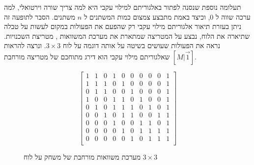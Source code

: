 \documentclass[12pt,leqno]{article}
\theoremstyle{theoremdd}
\begin{document}
תעלומה נוספת שנסנה לפתור באלגוריתם למילוי עקבי היא למה צריך שורה וירטואלי, למה ערכה 
שווה ל
$0$,
וכיצד באמת מתבצע צמצום כמות המשתנים ל
$n$
משתנים.
הסבר לתופעה זה
ניתן בעזרת תיאור אלגוריתם מילוי עקבי רק שהפעם את
הפעולות במקום לעשות על טבלה שתיארה את הלוח, נבצע על המטריצה שמתארת את מערכת המשוואות 
,
מטריצת השכנויות.
נראה את הפעולות שעושים בשיטה על אותה דוגמה 
על לוח 
$3 \times 3$.
 ונרצה להראות שאלגוריתם מילוי עקבי הוא דירג מתוחכם של מטריצה מורחבת 
$[M | \vec{1}]$.

\begin{figure}[ht]
    \caption{
        מערכת משוואות מורחבת של משחק על לוח 
        $3 \times 3$
    }
    \label{fig: full matrix 3 x 3}
    \begin{english}
        \begin{center}
            \[\left[
            \begin{array}{ccccccccc|c}
                    1& 1& 0& 1& 0& 0& 0& 0& 0& 1 \\
                    1& 1& 1& 0& 1& 0& 0& 0& 0& 1 \\
                    0& 1& 1& 0& 0& 1& 0& 0& 0& 1 \\
                    1& 0& 0& 1& 1& 0& 1& 0& 0& 1 \\
                    0& 1& 0& 1& 1& 1& 0& 1& 0& 1 \\
                    0& 0& 1& 0& 1& 1& 0& 0& 1& 1 \\
                    0& 0& 0& 1& 0& 0& 1& 1& 0& 1 \\
                    0& 0& 0& 0& 1& 0& 1& 1& 1& 1 \\
                    0& 0& 0& 0& 0& 1& 0& 1& 1& 1 \\
            \end{array}
            \right]\]
        \end{center}
    \end{english}
\end{figure}
\end{document}
